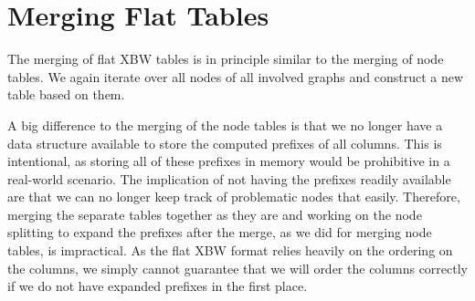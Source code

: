\documentclass[a4paper,12pt,twoside,BCOR=10mm]{scrbook}
\begin{document}
\section{Merging Flat Tables}
\label{sec:merging_flat_tables}
%

The merging of flat XBW tables is in principle similar to the merging of node tables.
We again iterate over all nodes of all involved graphs and construct a new table
based on them.

A big difference to the merging of the node tables is that we no longer have
a data structure available to store the computed prefixes of all columns.
This is intentional, as storing all of these prefixes in memory would be prohibitive
in a real-world scenario. The implication of not having the prefixes readily available
are that we can no longer keep track of problematic nodes that easily.
Therefore, merging the separate tables together as they are and working on the node splitting to expand the prefixes
after the merge, as we did for merging node tables, is impractical.
As the flat XBW format relies heavily on the ordering on the columns,
we simply cannot guarantee that we will order the columns correctly
if we do not have expanded prefixes in the first place.
\end{document}
